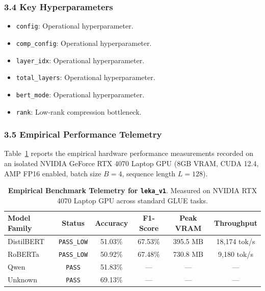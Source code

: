 \subsubsection*{3.4 Key Hyperparameters}
\begin{itemize}
    \item \texttt{config}: Operational hyperparameter.
    \item \texttt{comp\_config}: Operational hyperparameter.
    \item \texttt{layer\_idx}: Operational hyperparameter.
    \item \texttt{total\_layers}: Operational hyperparameter.
    \item \texttt{bert\_mode}: Operational hyperparameter.
    \item \texttt{rank}: Low-rank compression bottleneck.
\end{itemize}

\subsubsection*{3.5 Empirical Performance Telemetry}
Table~\ref{tab:telemetry_leka_v1} reports the empirical hardware performance measurements recorded on an isolated NVIDIA GeForce RTX 4070 Laptop GPU (8GB VRAM, CUDA 12.4, AMP FP16 enabled, batch size $B=4$, sequence length $L=128$).

\begin{table}[h]
\centering
\small
\caption{\textbf{Empirical Benchmark Telemetry for \texttt{leka\_v1}}. Measured on NVIDIA RTX 4070 Laptop GPU across standard GLUE tasks.}
\label{tab:telemetry_leka_v1}
\begin{tabular*}{\columnwidth}{@{\extracolsep{\fill}}lccccc}
\toprule
\textbf{Model Family} & \textbf{Status} & \textbf{Accuracy} & \textbf{F1-Score} & \textbf{Peak VRAM} & \textbf{Throughput} \\
\midrule
DistilBERT & \texttt{PASS\_LOW} & 51.03\% & 67.53\% & 395.5 MB & 18,174 tok/s \\
RoBERTa & \texttt{PASS\_LOW} & 50.92\% & 67.48\% & 730.8 MB & 9,180 tok/s \\
Qwen & \texttt{PASS} & 51.83\% & --- & --- & --- \\
Unknown & \texttt{PASS} & 69.13\% & --- & --- & --- \\
\bottomrule
\end{tabular*}
\end{table}

